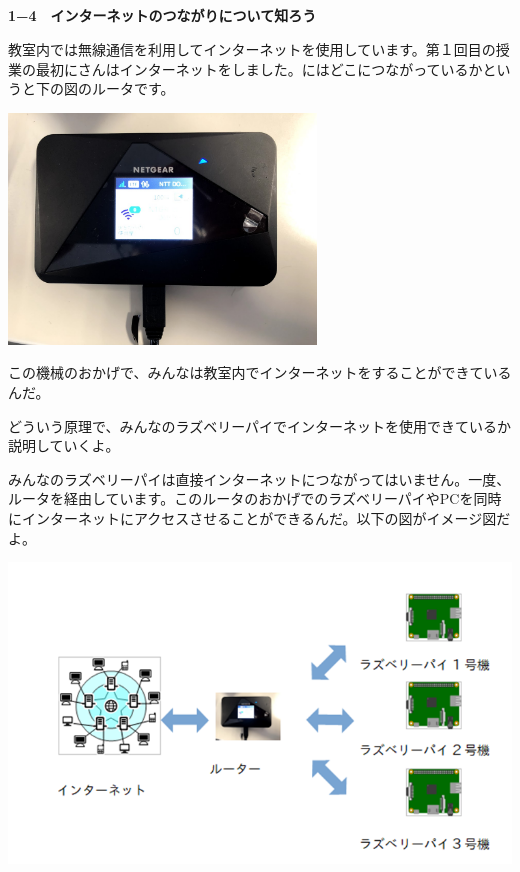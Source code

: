 \documentclass[a4paper,12pt,dvipdfmx]{jarticle}
\begin{document}
\flushleft


\subsection*{\bfseries }
\clearpage
\textbf{1−4　インターネットのつながりについて知ろう}

教室内では無線通信を利用してインターネットを使用しています。第１回目の授業の最初にさんはインターネットをしました。にはどこにつながっているかというと下の図のルータです。

\centering
\includegraphics[width=8.186cm]{ome7-img011.png}
\flushleft


\bigskip


\bigskip


\bigskip


\bigskip


\bigskip


\bigskip


\bigskip


\bigskip

この機械のおかげで、みんなは教室内でインターネットをすることができているんだ。

どういう原理で、みんなのラズベリーパイでインターネットを使用できているか説明していくよ。

みんなのラズベリーパイは直接インターネットにつながってはいません。一度、ルータを経由しています。このルータのおかげでのラズベリーパイやPCを同時にインターネットにアクセスさせることができるんだ。以下の図がイメージ図だよ。


\bigskip



\centering
\includegraphics[width=15.214cm]{ome7-img012.png}
\flushleft
\end{document}
